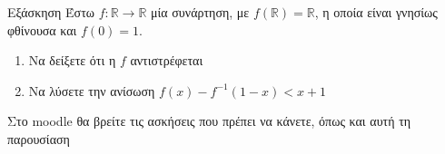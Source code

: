 \documentclass[greek]{beamer}
\begin{document}
\begin{frame}{Εξάσκηση}
  Έστω $f:\mathbb{R}\to\mathbb{R}$ μία συνάρτηση, με $f(\mathbb{R})=\mathbb{R}$, η οποία είναι γνησίως φθίνουσα και $f(0)=1$.
  \begin{enumerate}
    \item Να δείξετε ότι η $f$ αντιστρέφεται \pause
    \item Να λύσετε την ανίσωση $f(x)-f^{-1}(1-x)<x+1$
  \end{enumerate}
\end{frame}

\begin{frame}
  Στο moodle θα βρείτε τις ασκήσεις που πρέπει να κάνετε, όπως και αυτή τη παρουσίαση
\end{frame}
\end{document}
